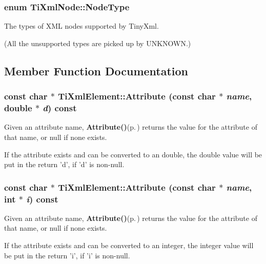 \subsubsection{\setlength{\rightskip}{0pt plus 5cm}enum {\bf Ti\-Xml\-Node::Node\-Type}\hspace{0.3cm}{\tt  [inherited]}}\label{classTiXmlNode_TiXmlUnknownw7}


The types of XML nodes supported by Tiny\-Xml. 

(All the unsupported types are picked up by UNKNOWN.)

\subsection{Member Function Documentation}
\subsubsection{\setlength{\rightskip}{0pt plus 5cm}const char $\ast$ Ti\-Xml\-Element::Attribute (const char $\ast$ {\em name}, double $\ast$ {\em d}) const}\label{classTiXmlElement_TiXmlElementa7}


Given an attribute name, {\bf Attribute()}{\rm (p.\,\pageref{classTiXmlElement_TiXmlElementa5})} returns the value for the attribute of that name, or null if none exists. 

If the attribute exists and can be converted to an double, the double value will be put in the return 'd', if 'd' is non-null.
\subsubsection{\setlength{\rightskip}{0pt plus 5cm}const char $\ast$ Ti\-Xml\-Element::Attribute (const char $\ast$ {\em name}, int $\ast$ {\em i}) const}\label{classTiXmlElement_TiXmlElementa6}


Given an attribute name, {\bf Attribute()}{\rm (p.\,\pageref{classTiXmlElement_TiXmlElementa5})} returns the value for the attribute of that name, or null if none exists. 

If the attribute exists and can be converted to an integer, the integer value will be put in the return 'i', if 'i' is non-null.
